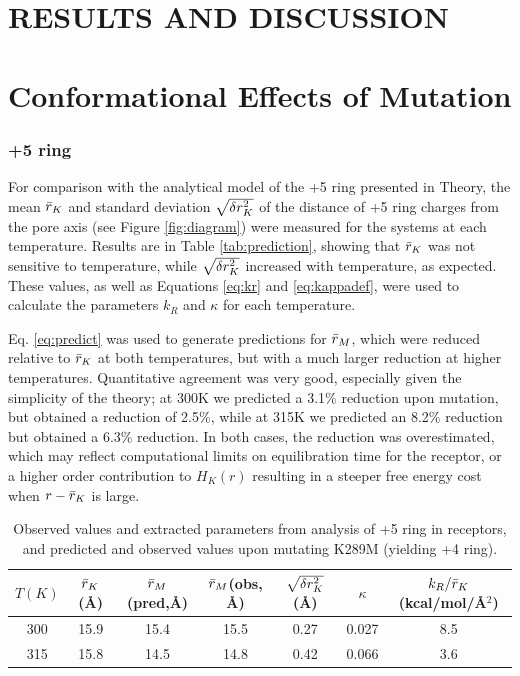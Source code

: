 \documentclass[journal=jacsat,manuscript=article]{achemso}
\begin{document}
\section*{RESULTS AND DISCUSSION}
\section*{Conformational Effects of Mutation}
\subsubsection*{+5 ring}

For comparison with the analytical model of the +5 ring presented in Theory,  the mean $\bar{r}_{K}$ and standard deviation  $ \sqrt{\delta r^{2}_{K}} $ of the distance of +5 ring charges from the pore axis (see Figure \ref{fig:diagram})  were measured for the \WT systems at each temperature.  Results are in Table \ref{tab:prediction}, showing that $\bar{r}_{K}$ was not sensitive to temperature, while $\sqrt{\delta r^{2}_{K}}$ increased with temperature, as expected.  These values, as well as Equations \ref{eq:kr} and \ref{eq:kappadef}, were used to calculate the parameters $k_{R}$ and $\kappa$ for each temperature.  

Eq. \ref{eq:predict} was used to generate predictions for $\bar{r}_{M}$, which were reduced relative to $\bar{r}_{K}$ at both temperatures, but with a much larger reduction at higher temperatures.  Quantitative agreement was very good, especially given the simplicity of the theory; at 300K we predicted a 3.1\% reduction upon mutation, but obtained a reduction of 2.5\%, while at 315K we predicted an 8.2\% reduction but obtained a 6.3\% reduction.  In both cases, the reduction was overestimated, which may reflect computational limits on equilibration time for the \MT receptor, or a higher order contribution to $H_{K}(r)$ resulting in a steeper free energy cost when $r-\bar{r}_{K}$ is large.     

\begin{table}[htp]
\caption{\label{tab:prediction} Observed values and extracted parameters from analysis of +5 ring in \WT receptors, and predicted and observed values upon mutating K289M (yielding +4 ring).}
\begin{center}
\begin{tabular}{|c|c|c|c|c|c|c|}
$T (K) $& $\bar{r}_{K} $(\AA) &$\bar{r}_{M}$(pred,\AA)&  $\bar{r}_{M}$(obs, \AA)& $ \sqrt{\delta r^{2}_{K}} $ (\AA)& $\kappa$ & $k_{R}/\bar{r}_{K}$ (kcal/mol/\AA$^{2}$)\\
\hline
300 & 15.9 & 15.4 &  15.5 & 0.27 &  0.027&8.5 \\
315 & 15.8 &   14.5&  14.8& 0.42 &  0.066 &3.6
\end{tabular}
\end{center}
\label{default}
\end{table}%
\end{document}
